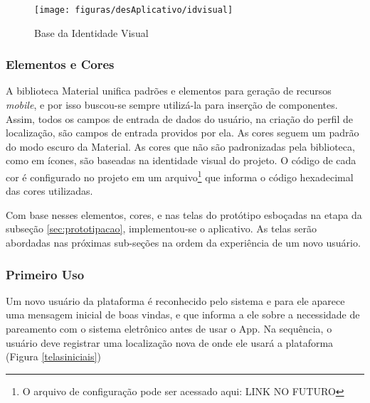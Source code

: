 \begin{figure}[!htb]
	\centering
	\caption{Base da Identidade Visual}
	\texttt{[image: figuras/desAplicativo/idvisual]}
	\label{fig:idvisual}
\end{figure}

\subsubsection{Elementos e Cores}
A biblioteca Material unifica padrões e elementos para geração de recursos \textit{mobile}, e por isso buscou-se sempre utilizá-la para inserção de componentes. Assim, todos os campos de entrada de dados do usuário, na criação do perfil de localização, são campos de entrada providos por ela. As cores seguem um padrão do modo escuro da Material. As cores que não são padronizadas pela biblioteca, como em ícones, são baseadas na identidade visual do projeto. O código de cada cor é configurado no projeto em um arquivo\footnote{O arquivo de configuração pode ser acessado aqui: LINK NO FUTURO} que informa o código hexadecimal das cores utilizadas. 


Com base nesses elementos, cores, e nas telas do protótipo esboçadas na etapa da subseção \ref{sec:prototipacao}, implementou-se o aplicativo. As telas serão abordadas nas próximas sub-seções na ordem da experiência de um novo usuário.

\subsubsection{Primeiro Uso}

Um novo usuário da plataforma é reconhecido pelo sistema e para ele aparece uma mensagem inicial de boas vindas, e que informa a ele sobre a necessidade de pareamento com o sistema eletrônico antes de usar o App. Na sequência, o usuário deve registrar uma localização nova de onde ele usará a plataforma (Figura \ref{telasiniciais})


